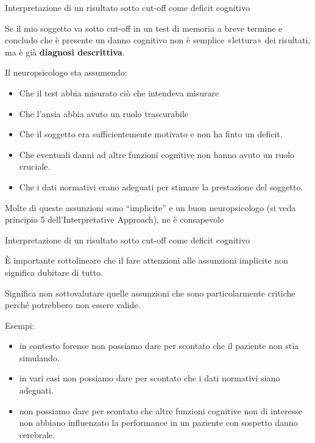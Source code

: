 \documentclass[
  ignorenonframetext,
]{beamer}
\providecommand{\tightlist}{%
  \setlength{\itemsep}{0pt}\setlength{\parskip}{0pt}}
\begin{document}
\begin{frame}{\normalsize Interpretazione di un risultato sotto cut-off
come deficit cognitivo}
\label{interpretazione-di-un-risultato-sotto-cut-off-come-deficit-cognitivo}
\small

Se il mio soggetto va sotto cut-off in un test di memoria a breve
termine e concludo che è presente un danno cognitivo non è semplice
«lettura» dei risultati, ma è già \textbf{diagnosi descrittiva}.

Il neuropsicologo sta assumendo:

\begin{itemize}
\tightlist
\item
  Che il test abbia misurato ciò che intendeva misurare \pause
\item
  Che l'ansia abbia avuto un ruolo trascurabile \pause
\item
  Che il soggetto era sufficientemente motivato e non ha finto un
  deficit. \pause
\item
  Che eventuali danni ad altre funzioni cognitive non hanno avuto un
  ruolo cruciale. \pause
\item
  Che i dati normativi erano adeguati per stimare la prestazione del
  soggetto. \pause
\end{itemize}

Molte di queste assunzioni sono ``implicite'' e un buon neuropsicologo
(si veda principio 5 dell'Interpretative Approach), ne è consapevole
\end{frame}

\begin{frame}{\normalsize Interpretazione di un risultato sotto cut-off
come deficit cognitivo}
\label{interpretazione-di-un-risultato-sotto-cut-off-come-deficit-cognitivo-1}
\small

È importante sottolineare che il fare attenzioni alle assunzioni
implicite non significa dubitare di tutto.

Significa non sottovalutare quelle assunzioni che sono particolarmente
critiche perché potrebbero non essere valide.

Esempi: \pause

\begin{itemize}
\tightlist
\item
  in contesto forense non possiamo dare per scontato che il paziente non
  stia simulando.\pause
\item
  in vari casi non possiamo dare per scontato che i dati normativi siano
  adeguati.\pause
\item
  non possiamo dare per scontato che altre funzioni cognitive non di
  interesse non abbiano influenzato la performance in un paziente con
  sospetto danno cerebrale.
\end{itemize}
\end{frame}
\end{document}
